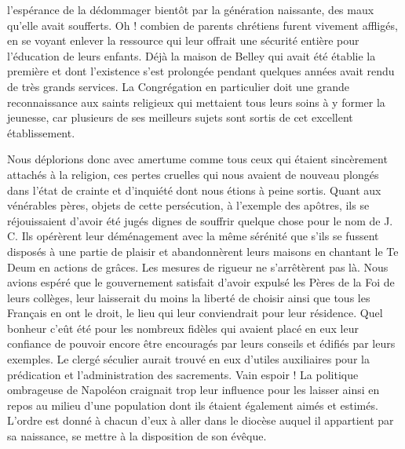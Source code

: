 l'espérance de la dédommager bientôt par la génération naissante, des maux qu'elle avait soufferts. Oh ! combien de parents chrétiens furent vivement affligés, en se voyant enlever la ressource qui leur offrait une sécurité entière pour l'éducation de leurs enfants. Déjà la maison de Belley qui avait été établie la première et dont l'existence s'est prolongée pendant quelques années avait rendu de très grands services. La Congrégation en particulier doit une grande reconnaissance aux saints religieux qui mettaient tous leurs soins à y former la jeunesse, car plusieurs de ses meilleurs sujets sont sortis de cet excellent établissement.

Nous déplorions donc avec amertume comme tous ceux qui étaient sincèrement attachés à la religion, ces pertes cruelles qui nous avaient de nouveau plongés dans l'état de crainte et d'inquiété dont nous étions à peine sortis. Quant aux vénérables pères, objets de cette persécution, à l'exemple des apôtres, ils se réjouissaient d'avoir été jugés dignes de souffrir quelque chose pour le nom de J. C. Ils opérèrent leur déménagement avec la même sérénité que s'ils se fussent disposés à une partie de plaisir et abandonnèrent leurs maisons en chantant le Te Deum en actions de grâces. Les mesures de rigueur ne s'arrêtèrent pas là. Nous avions espéré que le gouvernement satisfait d'avoir expulsé les Pères de la Foi de leurs collèges, leur laisserait du moins la liberté de choisir ainsi que tous les Français en ont le droit, le lieu qui leur conviendrait pour leur résidence. Quel bonheur c'eût été pour les nombreux fidèles qui avaient placé en eux leur confiance de pouvoir encore être encouragés par leurs conseils et édifiés par leurs exemples. Le clergé séculier aurait trouvé en eux d'utiles auxiliaires pour la prédication et l'administration
des sacrements. Vain espoir ! La politique ombrageuse de Napoléon craignait trop leur influence pour les laisser ainsi en repos au milieu d'une population dont ils étaient également aimés et estimés. L'ordre est donné à chacun d'eux à aller dans le diocèse auquel il appartient par sa naissance, se mettre à la disposition de son évêque.

